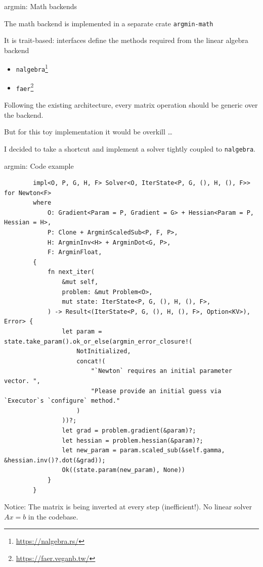 \documentclass{beamer}
\begin{document}
\begin{frame}{argmin: Math backends}

  The math backend is implemented in a separate crate \texttt{argmin-math}

  \vfill

  It is trait-based: interfaces define the methods required from the linear algebra backend

  \vfill

  \begin{itemize}
    \item \texttt{nalgebra}\footnote{\tiny \url{https://nalgebra.rs/}}
    \item \texttt{faer}\footnote{\tiny \url{https://faer.veganb.tw/}}
  \end{itemize}

  \vfill

  Following the existing architecture, every matrix operation should be generic over the backend.

  \vfill

  But for this toy implementation it would be overkill \dots

  \vfill

  I decided to take a shortcut and implement a solver tightly coupled to \texttt{nalgebra}.

\end{frame}

\begin{frame}[fragile]{argmin: Code example}

  \begin{listing}
    \begin{verbatim}
        impl<O, P, G, H, F> Solver<O, IterState<P, G, (), H, (), F>> for Newton<F>
        where
            O: Gradient<Param = P, Gradient = G> + Hessian<Param = P, Hessian = H>,
            P: Clone + ArgminScaledSub<P, F, P>,
            H: ArgminInv<H> + ArgminDot<G, P>,
            F: ArgminFloat,
        {
            fn next_iter(
                &mut self,
                problem: &mut Problem<O>,
                mut state: IterState<P, G, (), H, (), F>,
            ) -> Result<(IterState<P, G, (), H, (), F>, Option<KV>), Error> {
                let param = state.take_param().ok_or_else(argmin_error_closure!(
                    NotInitialized,
                    concat!(
                        "`Newton` requires an initial parameter vector. ",
                        "Please provide an initial guess via `Executor`s `configure` method."
                    )
                ))?;
                let grad = problem.gradient(&param)?;
                let hessian = problem.hessian(&param)?;
                let new_param = param.scaled_sub(&self.gamma, &hessian.inv()?.dot(&grad));
                Ok((state.param(new_param), None))
            }
        }
    \end{verbatim}

    \vfill

    \tiny
    Notice: The matrix is being inverted at every step (inefficient!). No linear solver $Ax = b$ in the codebase.
  \end{listing}

\end{frame}
\end{document}
